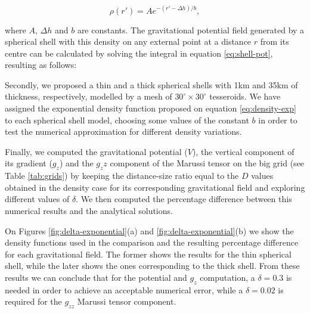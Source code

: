 \documentclass[extra]{gji}
\begin{document}
\begin{equation}
    \rho(r') = Ae^{-(r' - \Delta h)/b},
\end{equation}

\noindent where $A$, $\Delta h$ and $b$ are constants.
The gravitational potential field generated by a spherical shell with 
this density on any external point at a distance $r$ from its centre 
can be calculated by solving the integral in equation \ref{eq:shell-pot},
resulting as follows:


Secondly, we proposed a thin and a thick spherical shells with 1km and 
35km of thickness, respectively, modelled by a mesh of $30^\circ \times 
30^\circ$ tesseroids.
We have assigned the exponential density function proposed on equation 
\ref{eq:density-exp} to each spherical shell model, choosing some values 
of the constant $b$ in order to test the numerical approximation for 
different density variations.

Finally, we computed the gravitational potential ($V$), the 
vertical component of its gradient ($g_z$) and the $g_zz$ component of 
the Marussi tensor on the big grid (see Table \ref{tab:grids}) by 
keeping the distance-size ratio equal to the $D$ values obtained in the 
density case for its corresponding gravitational field and exploring 
different values of $\delta$.
We then computed the percentage difference between this numerical 
results and the analytical solutions.

On Figures \ref{fig:delta-exponential}(a) and 
\ref{fig:delta-exponential}(b) we show the density functions used in 
the comparison and the resulting percentage difference for each 
gravitational field.
The former shows the results for the thin spherical shell, while the 
later shows the ones corresponding to the thick shell.
From these results we can conclude that for the potential and $g_z$ 
computation, a $\delta = 0.3$ is needed in order to achieve an 
acceptable numerical error, while a $\delta = 0.02$ is required for the 
$g_{zz}$ Marussi tensor component.
\end{document}
